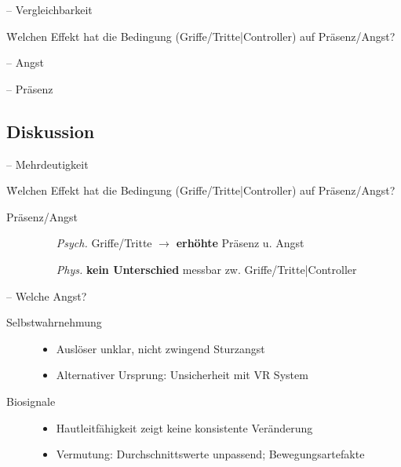 \begin{frame}{\currentname{} -- Vergleichbarkeit}
\begin{tabbing}
	\textcolor{primary}{} \quad \= Welchen Effekt hat die Bedingung (Griffe/Tritte|Controller) auf Präsenz/Angst?
\end{tabbing}
\end{frame}

\begin{frame}{\currentname{} -- Angst}

\end{frame}

\begin{frame}{\currentname{} -- Präsenz}

\end{frame}

\subsection{Diskussion}

\begin{frame}{\currentname{} -- Mehrdeutigkeit}
\begin{tabbing}
	\textcolor{primary}{} \quad \= Welchen Effekt hat die Bedingung (Griffe/Tritte|Controller) auf Präsenz/Angst?
\end{tabbing}
\begin{description}
	\item[Präsenz/Angst]\mbox{}
	\begin{itemize}
		\item[\textit{Psych.}] Griffe/Tritte $\rightarrow$ \textbf{erhöhte} Präsenz u. Angst
		\item[\textit{Phys.}] \textbf{kein Unterschied} messbar zw. Griffe/Tritte|Controller
	\end{itemize}
\end{description}
\end{frame}

\begin{frame}{\currentname{} -- Welche Angst?}
\begin{description}
	\item[Selbstwahrnehmung]\mbox{}
	\begin{itemize}[label=\textcolor{tertiary}{}]
		\item Auslöser unklar, nicht zwingend Sturzangst
		\item Alternativer Ursprung: Unsicherheit mit VR System
	\end{itemize}
	\item[Biosignale]\mbox{}
	\begin{itemize}[label=\textcolor{tertiary}{}]
		\item Hautleitfähigkeit zeigt keine konsistente Veränderung
		\item Vermutung: Durchschnittswerte unpassend; Bewegungsartefakte
	\end{itemize}
\end{description}
\end{frame}

